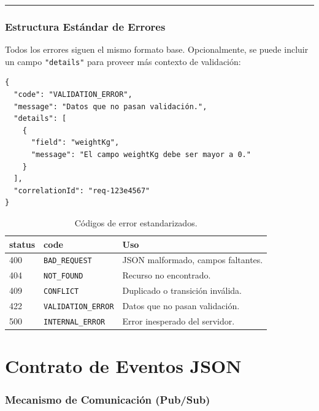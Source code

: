 \documentclass[11pt, a4paper]{article}
\begin{document}
\noindent\rule{\textwidth}{0.4pt}


\section{Estructura Estándar de Errores}
\label{sec:errores}

Todos los errores siguen el mismo formato base. Opcionalmente, se puede incluir un campo \texttt{"details"} para proveer más contexto de validación:

\begin{lstlisting}
{
  "code": "VALIDATION_ERROR",
  "message": "Datos que no pasan validación.",
  "details": [
    {
      "field": "weightKg",
      "message": "El campo weightKg debe ser mayor a 0."
    }
  ],
  "correlationId": "req-123e4567"
}
\end{lstlisting}

\begin{table}[h!]
\centering
\renewcommand{\arraystretch}{1.3}
\begin{tabularx}{\textwidth}{l l X}
  \toprule
  \textbf{status} & \textbf{code} & \textbf{Uso} \\
  \midrule
  400 & \texttt{BAD\_REQUEST}      & JSON malformado, campos faltantes. \\
  404 & \texttt{NOT\_FOUND}        & Recurso no encontrado. \\
  409 & \texttt{CONFLICT}          & Duplicado o transición inválida. \\
  422 & \texttt{VALIDATION\_ERROR} & Datos que no pasan validación. \\
  500 & \texttt{INTERNAL\_ERROR}   & Error inesperado del servidor. \\
  \bottomrule
\end{tabularx}
\caption{Códigos de error estandarizados.}
\end{table}


\newpage
\part{Contrato de Eventos JSON}

\section{Mecanismo de Comunicación (Pub/Sub)}
\end{document}
